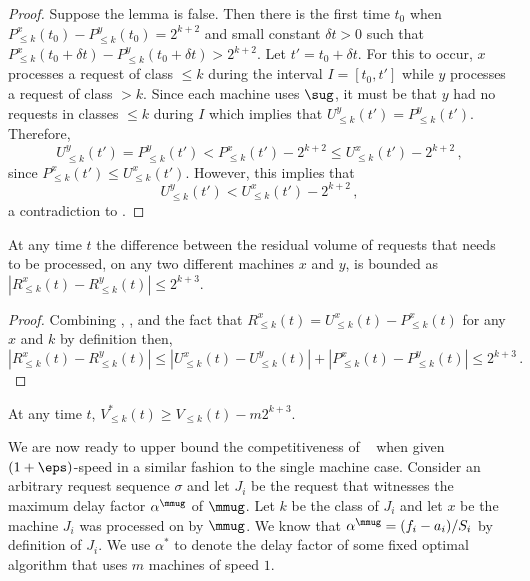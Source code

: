 \begin{proof}
  Suppose the lemma is false. Then there is the first time $t_0$ when
  $P^{x}_{\leq k} (t_0) - P^{y}_{\leq k} (t_0) = 2^{k+2}$ and small
  constant $\delta t > 0$ such that $P^{x}_{\leq k} (t_0 + \delta t) -
  P^{y}_{\leq k} (t_0 + \delta t) > 2^{k+2}$. Let $t' = t_0+\delta t$.
  For this to occur, $x$ processes a request of class $\le k$ during
  the interval $I = [t_0, t']$ while $y$ processes a request of class
  $> k$. Since each machine uses $\sug$, it must be that $y$ had no
  requests in classes $\le k$ during $I$ which implies that $U^y_{\le
    k}(t') = P^y_{\le k}(t')$. Therefore,
\[
U^{y}_{\leq k} (t') = P^{y}_{\leq k} (t') < P^{x}_{\leq k} (t') - 2^{k+2}
\le U^{x}_{\leq k} (t') - 2^{k+2}\,,
\]
since $P^{x}_{\leq k} (t') \le U^{x}_{\leq k} (t')$. However, this implies
that
\[
U^{y}_{\leq k} (t') < U^{x}_{\leq k} (t')  - 2^{k+2}\,,
\]
a contradiction to .
\end{proof}


\begin{lemma}
  \label{lem:closebound} At any time $t$ the difference between the
  residual volume of requests that needs to be processed, on any two
  different machines $x$ and $y$, is bounded as $|R^{x}_{\leq k} (t) -
  R^{y}_{\leq k}(t)| \leq 2^{k+3}$.
\end{lemma}

\begin{proof}
Combining , ,
and the fact that $R^{x}_{\leq k}(t) = U^{x}_{\leq k}(t) - P^{x}_{\leq k}(t)$ for any $x$ and $k$ by definition then,
\[
|R^{x}_{\leq k} (t) -  R^{y}_{\leq k}(t)| \le
|U^{x}_{\leq k} (t) -  U^{y}_{\leq k}(t)| + |P^{x}_{\leq k} (t) -  P^{y}_{\leq k}(t)| \le 2^{k+3}\,.
\]
\end{proof}


\begin{corollary}
  \label{cor:optarrival} At any time $t$, $V^*_{\leq k} (t) \geq V_{\leq
    k} (t) - m2^{k+3}$.
\end{corollary}

%
%
%
%
%

We are now ready to upper bound the competitiveness of \mmug~ when given $(1+\eps)$-speed in a similar fashion to the single machine
case. Consider an arbitrary request sequence $\sigma$ and let $J_i$ be
the request that witnesses the maximum delay factor $\alpha^\mmug$ of $\mmug$. Let $k$ be the class of $J_i$ and let $x$ be the machine $J_i$ was processed on by $\mmug$.  We know that $\alpha^\mmug = (f_i - a_i)/S_i$ by definition of $J_i$. We use $\alpha^*$ to denote the delay factor of some fixed optimal
algorithm that uses $m$ machines of speed $1$.

